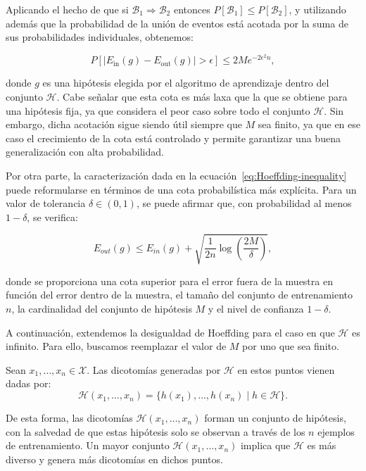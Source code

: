 Aplicando el hecho de que si $\mathcal{B}_1 \Rightarrow \mathcal{B}_2$ entonces $P[\mathcal{B}_1] \leq P[\mathcal{B}_2]$, y utilizando además que la probabilidad de la unión de eventos está acotada por la suma de sus probabilidades individuales, obtenemos:

\begin{equation}\label{eq:Hoeffding-inequality}
    P\left[ \left| E_{\text{in}}(g) - E_{\text{out}}(g) \right| > \epsilon \right] 
    \leq 2M e^{-2\epsilon^2 n},
\end{equation}

donde $g$ es una hipótesis elegida por el algoritmo de aprendizaje dentro del conjunto $\mathcal{H}$. Cabe señalar que esta cota es más laxa que la que se obtiene para una hipótesis fija, ya que considera el peor caso sobre todo el conjunto $\mathcal{H}$. Sin embargo, dicha acotación sigue siendo útil siempre que $M$ sea finito, ya que en ese caso el crecimiento de la cota está controlado y permite garantizar una buena generalización con alta probabilidad.

Por otra parte, la caracterización dada en la ecuación~\eqref{eq:Hoeffding-inequality} puede reformularse en términos de una cota probabilística más explícita. Para un valor de tolerancia $\delta \in (0,1)$, se puede afirmar que, con probabilidad al menos $1 - \delta$, se verifica:

\[
    E_{out}(g) \leq E_{in}(g) + \sqrt{\frac{1}{2n} \log\left(\frac{2M}{\delta}\right)},
\]

donde se proporciona una cota superior para el error fuera de la muestra en función del error dentro de la muestra, el tamaño del conjunto de entrenamiento $n$, la cardinalidad del conjunto de hipótesis $M$ y el nivel de confianza $1 - \delta$.

A continuación, extendemos la desigualdad de Hoeffding para el caso en que $\mathcal{H}$ es infinito. Para ello, buscamos reemplazar el valor de $M$ por uno que sea finito.

\begin{definicion}
    Sean $x_1, \ldots, x_n \in \mathcal{X}$. Las dicotomías generadas por $\mathcal{H}$ en estos puntos vienen dadas por:
    \[
        \mathcal{H}(x_1, \ldots, x_n) = \{ h(x_1), \ldots, h(x_n) \mid h \in \mathcal{H} \}.
    \]
\end{definicion}

De esta forma, las dicotomías $\mathcal{H}(x_1, \ldots, x_n)$ forman un conjunto de hipótesis, con la salvedad de que estas hipótesis solo se observan a través de los $n$ ejemplos de entrenamiento. Un mayor conjunto $\mathcal{H}(x_1, \ldots, x_n)$ implica que $\mathcal{H}$ es más diverso y genera más dicotomías en dichos puntos.

